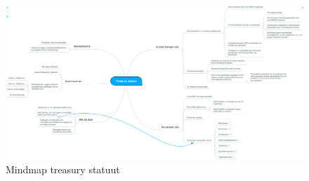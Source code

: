 \documentclass[10pt,a4paper,twoside]{report}
\begin{document}
\begin{figure}
    \centering
    \includegraphics[angle=90,height=0.95\textheight]{treasury}
    \caption{Mindmap treasury statuut}
    \label{fig:mmtreasury}
\end{figure}
\printbibliography
{}
\end{document}
